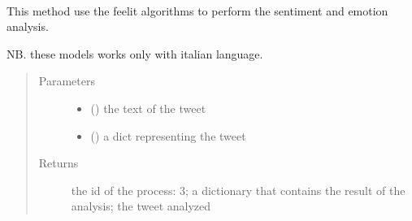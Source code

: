 \documentclass[letterpaper,10pt,english]{sphinxmanual}
\begin{document}
\begin{fulllineitems}
\label{\detokenize{code_comment/tweet_processor:hate_tweet_map.tweets_processor.TweetProcessor.ProcessTweet}}~

\begin{fulllineitems}
\label{\detokenize{code_comment/tweet_processor:hate_tweet_map.tweets_processor.TweetProcessor.ProcessTweet.__feel_it_analyze_sentiment}}
\sphinxAtStartPar
This method use the feel\sphinxhyphen{}it algorithms to perform the sentiment and emotion analysis.

\begin{DUlineblock}{0em}
\item[] NB. these models works only with italian language.
\end{DUlineblock}
\begin{quote}\begin{description}
\item[{Parameters}] \leavevmode\begin{itemize}
\item {} 
\sphinxAtStartPar
{} () \textendash{} the text of the tweet

\item {} 
\sphinxAtStartPar
{} () \textendash{} a dict representing the tweet

\end{itemize}

\item[{Returns}] \leavevmode
\sphinxAtStartPar
the id of the process: 3; a dictionary that contains the result of the analysis; the tweet analyzed


\end{description}
\end{quote}
\end{fulllineitems}
\end{fulllineitems}
\end{document}
